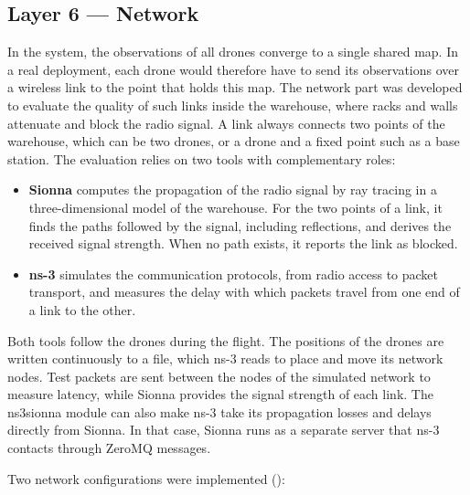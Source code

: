 \subsection*{Layer 6 --- Network}

In the system, the observations of all drones converge to a single shared map. In
a real deployment, each drone would therefore have to send its observations over
a wireless link to the point that holds this map. The network part was developed
to evaluate the quality of such links inside the warehouse, where racks and walls
attenuate and block the radio signal. A link always connects two points of the
warehouse, which can be two drones, or a drone and a fixed point such as a base
station. The evaluation relies on two tools with complementary roles:

\begin{itemize}[itemsep=0.35em]
    \item \textbf{Sionna} computes the propagation of the radio signal by ray
          tracing in a three-dimensional model of the warehouse. For the two points
          of a link, it finds the paths followed by the signal, including
          reflections, and derives the received signal strength. When no path
          exists, it reports the link as blocked.
    \item \textbf{ns-3} simulates the communication protocols, from radio access to
          packet transport, and measures the delay with which packets travel from
          one end of a link to the other.
\end{itemize}

Both tools follow the drones during the flight. The positions of the drones are
written continuously to a file, which ns-3 reads to place and move its network
nodes. Test packets are sent between the nodes of the simulated network to
measure latency, while Sionna provides the signal strength of each link. The
ns3sionna module can also make ns-3 take its propagation losses and delays
directly from Sionna. In that case, Sionna runs as a separate server that ns-3
contacts through ZeroMQ messages.

Two network configurations were implemented ():

